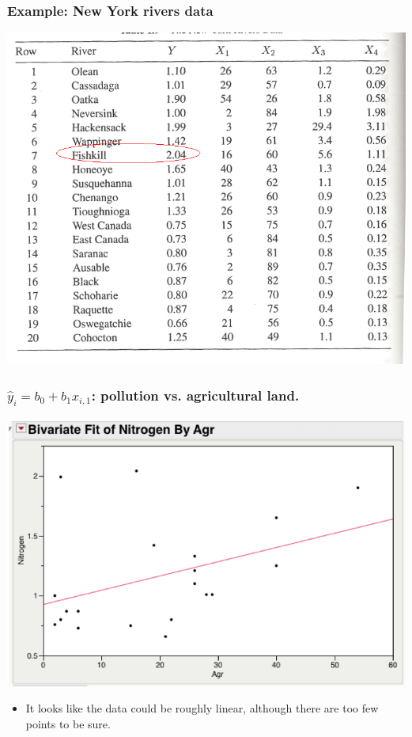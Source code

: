 \documentclass[handout]{beamer}\usepackage{graphicx, color}
\providecommand{\wh}[1]{\widehat{#1}}
\numberwithin{equation}{section}
\begin{document}
\begin{frame}
\frametitle{Example: New York rivers data}
 \includegraphics{../../fig/riversdata.png}
\end{frame}


\begin{frame}
\frametitle{$\wh{y}_i = b_0 + b_1 x_{i, 1} $: pollution vs. agricultural land.}
\begin{center}
 \includegraphics{../../fig/riversmodel1plot.png}
\end{center}
\begin{itemize}
\pause \item It looks like the data could be roughly linear, although there are too few points to be sure.
\end{itemize}
\end{frame}
\end{document}
